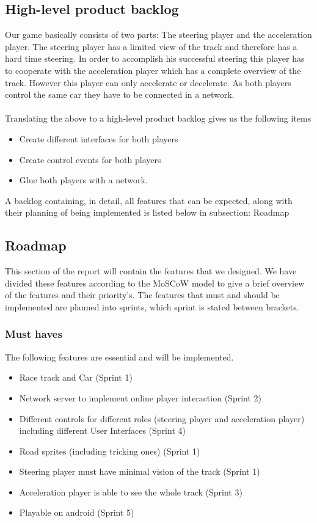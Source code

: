 \documentclass{article}
\begin{document}
\subsection{High-level product backlog}
Our game basically consists of two parts: The \gls{steering player} and the \gls{acceleration player}. The steering player has a limited view of the track and therefore has a hard time steering. In order to accomplish his successful steering this player has to cooperate with the acceleration player which has a complete overview of the track. However this player can only accelerate or decelerate. As both players control the same car they have to be connected in a network. \\\\
Translating the above to a high-level product backlog gives us the following items
\begin{itemize}
	\item Create different interfaces for both players
	\item Create control events for both players
	\item Glue both players with a network.
\end{itemize}
A backlog containing, in detail, all features that can be expected, along with their planning of being implemented is listed below in subsection: Roadmap
\subsection{Roadmap}
This section of the report will contain the features that we designed. We have divided these features according to the \gls{MoSCoW} model to give a brief overview of the features and their priority's. The features that must and should be implemented are planned into sprints, which sprint is stated between brackets.
\subsubsection{Must haves}
The following features are essential and will be implemented.
\begin{itemize}
	\item Race track and Car (Sprint 1)
	\item Network server to implement online player interaction (Sprint 2)
	\item Different controls for different roles (\gls{steering player} and \gls{acceleration player}) including different User Interfaces (Sprint 4)
	\item Road sprites (including tricking ones) (Sprint 1)
    \item Steering player must have minimal vision of the track (Sprint 1)
    \item Acceleration player is able to see the whole track (Sprint 3)
    \item Playable on android (Sprint 5)
\end{itemize}
\end{document}
